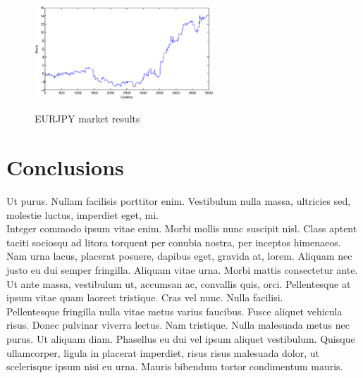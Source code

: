 \documentclass{tewiart}
\begin{document}
\begin{figure}[h]
\begin{minipage}{.49\linewidth}
\label{mansard}
\end{minipage}
\begin{minipage}{\linewidth}
\centering 
\includegraphics[width=0.6\textwidth]{S1s.eps}
\label{mansard}
\end{minipage}
\caption{EURJPY market results}
\end{figure}
\FloatBarrier

\section{Conclusions}
Ut purus. Nullam facilisis porttitor enim. Vestibulum nulla massa, ultricies
sed, molestie luctus, imperdiet eget, mi. \\
\indent Integer commodo ipsum vitae enim. Morbi mollis nunc suscipit nisl.
Class aptent taciti sociosqu ad litora torquent per conubia nostra, per
inceptos himenaeos. Nam urna lacus, placerat posuere, dapibus eget, gravida
at, lorem. Aliquam nec justo eu dui semper fringilla. Aliquam vitae urna.
Morbi mattis consectetur ante. Ut ante massa, vestibulum ut, accumsan ac,
convallis quis, orci. Pellentesque at ipsum vitae quam laoreet tristique. Cras
vel nunc. Nulla facilisi.\\
\indent Pellentesque fringilla nulla vitae metus varius faucibus. Fusce aliquet
vehicula risus. Donec pulvinar viverra lectus. Nam tristique. Nulla malesuada
metus nec purus. Ut aliquam diam. Phasellus eu dui vel ipsum aliquet
vestibulum. Quisque ullamcorper, ligula in placerat imperdiet, risus risus
malesuada dolor, ut scelerisque ipsum nisi eu urna. Mauris bibendum tortor
condimentum mauris.  





\end{document}
